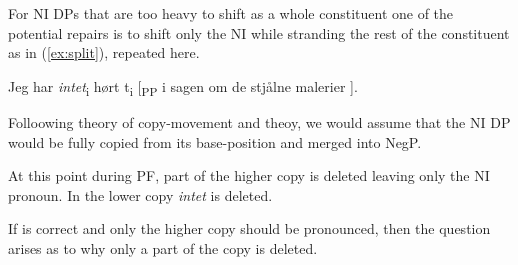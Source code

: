 \documentclass[12pt, letterpaper]{article}
\begin{document}
For NI DPs that are too heavy to shift as a whole constituent one of the potential repairs is to shift only the NI while stranding the rest of the constituent as in (\ref{ex:split}), repeated here.

\ea Jeg har \textit{intet}\textsubscript{i} hørt t\textsubscript{i} [\textsubscript{PP} i sagen om de stjålne malerier ].
\z 

Folloowing  theory of copy-movement and  theoy, we would assume that the NI DP would be fully copied from its base-position and merged into NegP.

\ea {}
\z 
At this point during PF, part of the higher copy is deleted leaving only the NI pronoun. In the lower copy \emph{intet} is deleted.
\ea	\label{ex:tree} 

\z 
If \citet{chomskyMinimalistInquiriesFramework2000} is correct and only the higher copy should be pronounced, then the question arises as to why only a part of the copy is deleted. 
\end{document}
